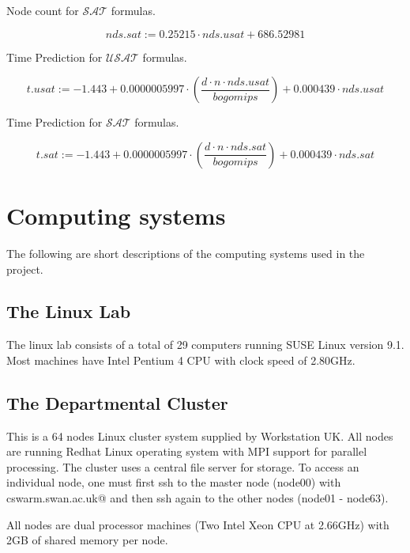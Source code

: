 \documentclass{book}
\begin{document}
Node count for $\mathcal{SAT}$ formulas.

\begin{displaymath}
nds.sat := 0.25215 \cdot nds.usat + 686.52981
\end{displaymath}

Time Prediction for $\mathcal{USAT}$ formulas.

\begin{displaymath}
t.usat := -1.443 + 0.0000005997 \cdot (\frac{d \cdot n \cdot nds.usat}{bogomips}) + 0.000439 \cdot nds.usat
\end{displaymath}

Time Prediction for $\mathcal{SAT}$ formulas.

\begin{displaymath}
t.sat := -1.443 + 0.0000005997 \cdot (\frac{d \cdot n \cdot nds.sat}{bogomips}) + 0.000439 \cdot nds.sat
\end{displaymath}




\chapter{Computing systems}
\label{cha:computing}

The following are short descriptions of the computing systems used in the project.
 
\section{The Linux Lab}
\label{sec:computinglinux}

The linux lab consists of a total of 29 computers running SUSE Linux version 9.1. Most machines have Intel Pentium 4 CPU with clock speed of 2.80GHz.  

\section{The Departmental Cluster}
\label{sec:computingcluster}

This is a 64 nodes Linux cluster system supplied by Workstation UK. All nodes are running Redhat Linux operating system with MPI support for parallel processing. The cluster uses a central file server for storage. To access an individual node, one must first ssh to the master node (node00) with \verb@ssh cswarm.swan.ac.uk@ and then ssh again to the other nodes (node01 - node63).

All nodes are dual processor machines (Two Intel Xeon CPU at 2.66GHz) with 2GB of shared memory per node.      
    
\end{document}

